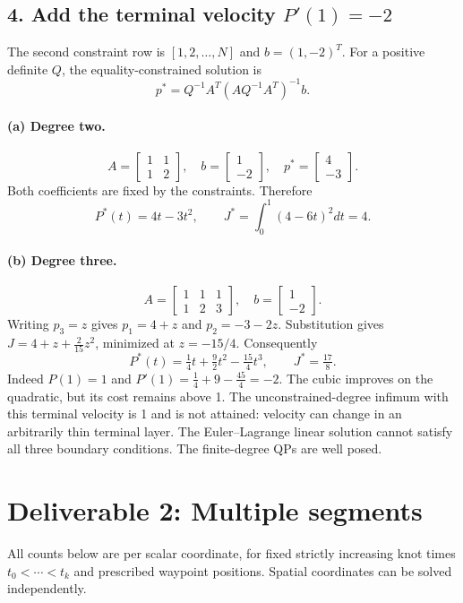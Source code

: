 \documentclass[11pt]{article}
\begin{document}
\subsection*{4. Add the terminal velocity $P'(1)=-2$}
The second constraint row is $[1,2,\ldots,N]$ and $b=(1,-2)^T$.
For a positive definite $Q$, the equality-constrained solution is
\[
p^*=Q^{-1}A^T(AQ^{-1}A^T)^{-1}b.
\]
\paragraph{(a) Degree two.}
\[
A=\begin{bmatrix}1&1\\1&2\end{bmatrix},\quad b=\begin{bmatrix}1\\-2\end{bmatrix},\quad
p^*=\begin{bmatrix}4\\-3\end{bmatrix}.
\]
Both coefficients are fixed by the constraints. Therefore
\[
\boxed{P^*(t)=4t-3t^2,\qquad J^*=\int_0^1(4-6t)^2dt=4.}
\]
\paragraph{(b) Degree three.}
\[
A=\begin{bmatrix}1&1&1\\1&2&3\end{bmatrix},\quad b=\begin{bmatrix}1\\-2\end{bmatrix}.
\]
Writing $p_3=z$ gives $p_1=4+z$ and $p_2=-3-2z$.
Substitution gives $J=4+z+\tfrac{2}{15}z^2$, minimized at $z=-15/4$.
Consequently
\[
\boxed{P^*(t)=\tfrac14t+\tfrac92t^2-\tfrac{15}{4}t^3,\qquad J^*=\tfrac{17}{8}.}
\]
Indeed $P(1)=1$ and $P'(1)=\tfrac14+9-\tfrac{45}{4}=-2$.
The cubic improves on the quadratic, but its cost remains above 1.
The unconstrained-degree infimum with this terminal velocity is 1 and is not attained:
velocity can change in an arbitrarily thin terminal layer. The Euler--Lagrange
linear solution cannot satisfy all three boundary conditions. The finite-degree QPs are well posed.

\section*{Deliverable 2: Multiple segments}
All counts below are per scalar coordinate, for fixed strictly increasing knot times
$t_0<\cdots<t_k$ and prescribed waypoint positions. Spatial coordinates can be solved independently.
\end{document}
